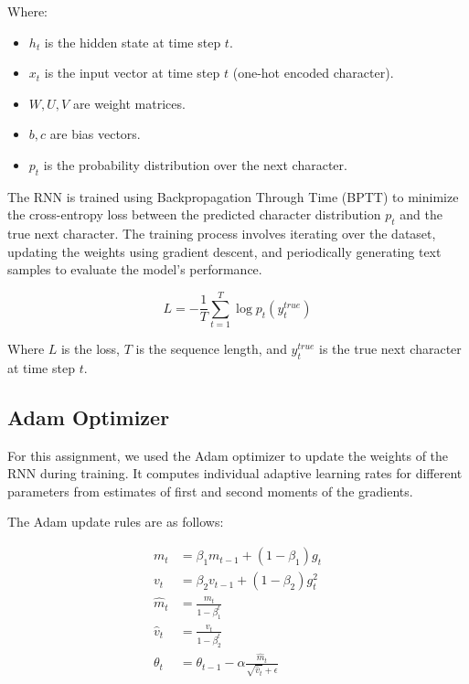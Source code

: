 \documentclass{article}
\begin{document}
Where:
\begin{itemize}
    \item \( h_t \) is the hidden state at time step \( t \).
    \item \( x_t \) is the input vector at time step \( t \) (one-hot encoded character).
    \item \( W, U, V \) are weight matrices.
    \item \( b, c \) are bias vectors.
    \item \( p_t \) is the probability distribution over the next character.
\end{itemize}

The RNN is trained using Backpropagation Through Time (BPTT) to minimize the cross-entropy loss between the predicted character distribution \( p_t \) and the true next character. The training process involves iterating over the dataset, updating the weights using gradient descent, and periodically generating text samples to evaluate the model's performance.

\begin{equation}
    L = -\frac{1}{T}\sum_{t=1}^{T} \log p_t(y_t^{true}) 
\end{equation}

Where \( L \) is the loss, \( T \) is the sequence length, and \( y_t^{true} \) is the true next character at time step \( t \).

\subsection{Adam Optimizer}

For this assignment, we used the Adam optimizer to update the weights of the RNN during training. It computes individual adaptive learning rates for different parameters from estimates of first and second moments of the gradients.

The Adam update rules are as follows:

\begin{align}
    m_t &= \beta_1 m_{t-1} + (1 - \beta_1) g_t \\
    v_t &= \beta_2 v_{t-1} + (1 - \beta_2) g_t^2 \\
    \hat{m}_t &= \frac{m_t}{1 - \beta_1^t} \\
    \hat{v}_t &= \frac{v_t}{1 - \beta_2^t} \\
    \theta_t &= \theta_{t-1} - \alpha \frac{\hat{m}_t}{\sqrt{\hat{v}_t} + \epsilon}
\end{align}
\end{document}
